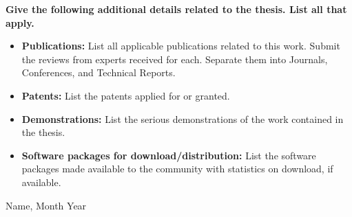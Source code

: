 \documentclass[11pt]{article}
\begin{document}
    {\bf Give the following additional details related to the thesis. 
        List all that apply.}
    \begin{itemize}
        \setlength{\itemsep}{0mm}
        \item {\bf Publications:}
            List all applicable publications related to this work. 
            Submit the reviews from experts received for each. 
            Separate them into Journals, Conferences, and Technical 
            Reports.
        \item {\bf Patents:}
            List the patents applied for or granted.
        \item {\bf Demonstrations:}
            List the serious demonstrations of the work contained in 
            the thesis.
        \item {\bf Software packages for download/distribution:}
            List the software packages made available to the community 
            with statistics on download, if available.
    \end{itemize}
    \hspace{\fill} {\tiny Name, Month Year}
\end{document}
